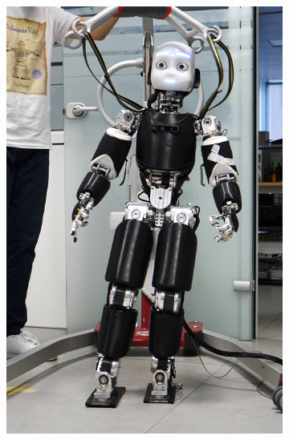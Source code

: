 \begin{figure}[!t]
\begin{subfigure}[b]{0.32\textwidth}
        \includegraphics[width=\columnwidth]{chapter_centroidal_mpc/figures/icub5.png}
    \end{subfigure}
    \hfill
     \begin{subfigure}[b]{0.32\textwidth}
        \centering

\end{subfigure}
\end{figure}

